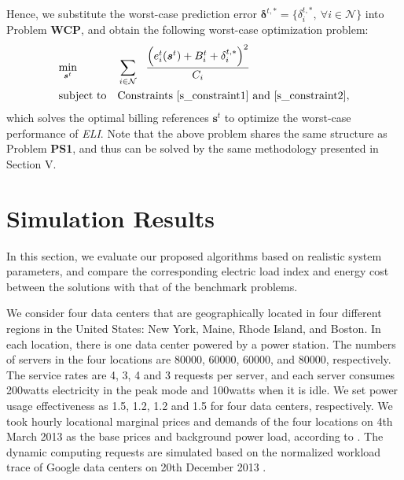 \documentclass[journal]{IEEEtran}
\begin{document}
    
    Hence, we substitute the worst-case prediction error $\boldsymbol{\delta}^{t,\ast} = \{\delta_i^{t,\ast},~\forall i \in \mathcal{N}\}$ into Problem \textbf{WCP}, and obtain the following worst-case optimization problem:
    \begin{equation*}
    \begin{aligned}
    & \underset{\boldsymbol{s}^{t}} {\min} 
    & & \sum_{i \in \mathcal{N}}~~   \frac{ \Big( e_{i}^{t}(\boldsymbol{s}^{t})+B_{i}^{t} + \delta_i^{t,\ast} \Big)^{2} }{C_i} \\
    & \text{subject to}
    & & \text{Constraints \eqref{s_constraint1} and \eqref{s_constraint2}},
    \end{aligned}
    \end{equation*}
    which solves the optimal billing references $\boldsymbol{s}^{t}$ to optimize the worst-case performance of \emph{ELI}. Note that the above problem shares the same structure as Problem \textbf{PS1}, and thus can be solved by the same methodology presented in Section V.
    
	
	\section{Simulation Results}
	In this section, we evaluate our proposed algorithms based on realistic system parameters, and compare the corresponding electric load index and energy cost between the solutions with that of the benchmark problems. 
	
	We consider four data centers that are geographically located in four different regions in the United States: New York, Maine, Rhode Island, and Boston. In each location, there is one data center powered by a power station. The numbers of servers in the four locations are 80000, 60000, 60000, and 80000, respectively. The service rates are 4, 3, 4 and 3 requests per server, and each server consumes 200watts electricity in the peak mode and 100watts when it is idle. We set power usage effectiveness as 1.5, 1.2, 1.2 and 1.5 for four data centers, respectively. We took hourly locational marginal prices and demands of the four locations on 4th March 2013 as the base prices and background power load, according to \cite{data1,data2}. The dynamic computing requests are simulated based on the normalized workload trace of Google data centers on 20th December 2013 \cite{data3,data4}.
	
\end{document}
